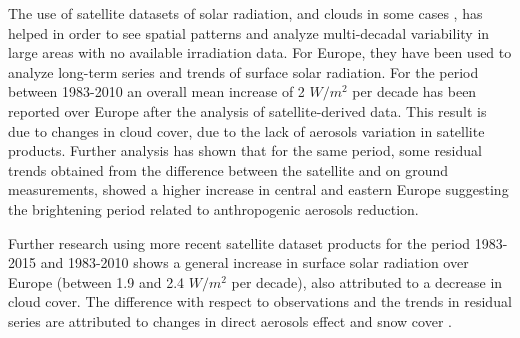 The use of satellite datasets of solar radiation, and clouds in some cases \cite*{Pfeifroth2017}, has helped in order to see spatial patterns and analyze multi-decadal variability in large areas with no available irradiation data. For Europe, they have been used to analyze long-term series and trends of surface solar radiation. For the period between 1983-2010 an overall mean increase of 2 $W/m^2$ per decade has been reported over Europe after the analysis of satellite-derived data. This result is due to changes in cloud cover, due to the lack of aerosols variation in satellite products. Further analysis has shown that for the same period, some residual trends obtained from the difference between the satellite and on ground measurements, showed a higher increase in central and eastern Europe suggesting the brightening period related to anthropogenic aerosols reduction.

Further research using more recent satellite dataset products for the period 1983-2015 and 1983-2010 shows a general increase in surface solar radiation over Europe (between 1.9 and 2.4 $W/m^2$ per decade), also attributed to a decrease in cloud cover. The difference with respect to observations and the trends in residual series are attributed to changes in direct aerosols effect and snow cover \cite*{Pfeifroth2018, Sanchez-Lorenzo2017}. 









